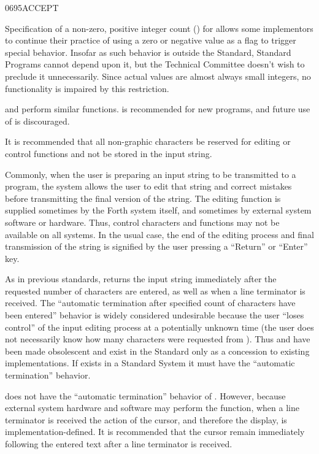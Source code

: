 \begin{worddef}{0695}{ACCEPT}
\begin{defer}
		Specification of a non-zero, positive integer count ()
		for  allows some implementors to continue their
		practice of using a zero or negative value as a flag to trigger
		special behavior. Insofar as such behavior is outside the
		Standard, Standard Programs cannot depend upon it, but the
		Technical Committee doesn't wish to preclude it unnecessarily.
		Since actual values are almost always small integers, no
		functionality is impaired by this restriction.

		 and  perform similar functions.
		 is recommended for new programs, and future use
		of  is discouraged.

		It is recommended that all non-graphic characters be reserved
		for editing or control functions and not be stored in the input
		string.

		Commonly, when the user is preparing an input string to be
		transmitted to a program, the system allows the user to edit
		that string and correct mistakes before transmitting the final
		version of the string. The editing function is supplied
		sometimes by the Forth system itself, and sometimes by external
		system software or hardware. Thus, control characters and
		functions may not be available on all systems. In the usual
		case, the end of the editing process and final transmission of
		the string is signified by the user pressing a ``Return'' or
		``Enter'' key.

		As in previous standards,  returns the input
		string immediately after the requested number of characters
		are entered, as well as when a line terminator is received.
		The ``automatic termination after specified count of characters
		have been entered'' behavior is widely considered undesirable
		because the user ``loses control'' of the input editing process
		at a potentially unknown time (the user does not necessarily
		know how many characters were requested from ).
		Thus  and  have been made obsolescent
		and exist in the Standard only as a concession to existing
		implementations. If  exists in a Standard System
		it must have the ``automatic termination'' behavior.

		 does not have the ``automatic termination''
		behavior of . However, because external system
		hardware and software may perform the  function,
		when a line terminator is received the action of the cursor,
		and therefore the display, is implementation-defined. It is
		recommended that the cursor remain immediately following the
		entered text after a line terminator is received.


\end{defer}
\end{worddef}
